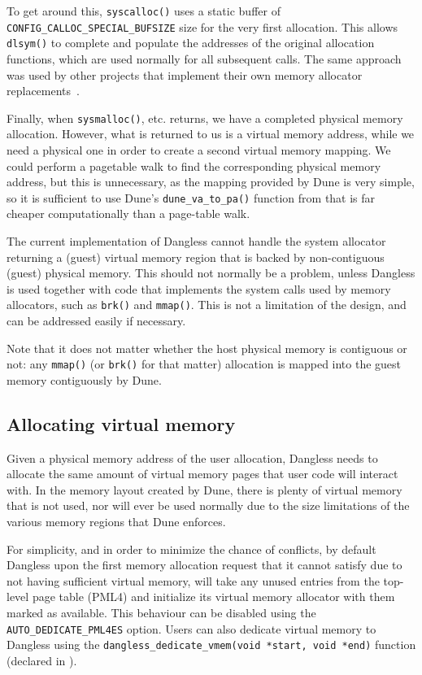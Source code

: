 To get around this, \lstinline!syscalloc()! uses a static buffer of \lstinline!CONFIG_CALLOC_SPECIAL_BUFSIZE! size for the very first allocation. This allows \lstinline!dlsym()! to complete and populate the addresses of the original allocation functions, which are used normally for all subsequent calls. The same approach was used by other projects that implement their own memory allocator replacements~\cite{dlsym-calloc-special-ex1}.

Finally, when \lstinline!sysmalloc()!, etc. returns, we have a completed physical memory allocation. However, what is returned to us is a virtual memory address, while we need a physical one in order to create a second virtual memory mapping. We could perform a pagetable walk to find the corresponding physical memory address, but this is unnecessary, as the mapping provided by Dune is very simple, so it is sufficient to use Dune's \lstinline!dune_va_to_pa()! function from  that is far cheaper computationally than a page-table walk.

The current implementation of Dangless cannot handle the system allocator returning a (guest) virtual memory region that is backed by non-contiguous (guest) physical memory. This should not normally be a problem, unless Dangless is used together with code that implements the system calls used by memory allocators, such as \lstinline!brk()! and \lstinline!mmap()!. This is not a limitation of the design, and can be addressed easily if necessary.

Note that it does not matter whether the host physical memory is contiguous or not: any \lstinline!mmap()! (or \lstinline!brk()! for that matter) allocation is mapped into the guest memory contiguously by Dune.

\subsection{Allocating virtual memory}
\label{sec:dangless-alloc-virtmem}

Given a physical memory address of the user allocation, Dangless needs to allocate the same amount of virtual memory pages that user code will interact with. In the memory layout created by Dune, there is plenty of virtual memory that is not used, nor will ever be used normally due to the size limitations of the various memory regions that Dune enforces.

For simplicity, and in order to minimize the chance of conflicts, by default Dangless upon the first memory allocation request that it cannot satisfy due to not having sufficient virtual memory, will take any unused entries from the top-level page table (PML4)  and initialize its virtual memory allocator with them marked as available. This behaviour can be disabled using the \lstinline!AUTO_DEDICATE_PML4ES! option. Users can also dedicate virtual memory to Dangless using the \lstinline!dangless_dedicate_vmem(void *start, void *end)! function (declared in ).

